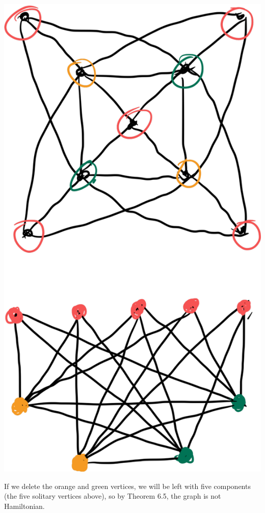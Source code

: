 \documentclass[9pt]{extarticle}
\begin{document}
\begin{problem}{11}
\begin{center}
      \includegraphics[scale=0.15]{6_11_sol.png}
    \end{center}
    If we delete the orange and green vertices, we will be left with five components (the five solitary vertices above), so by Theorem 6.5, the graph is not Hamiltonian.
  \end{problem}
\end{document}
